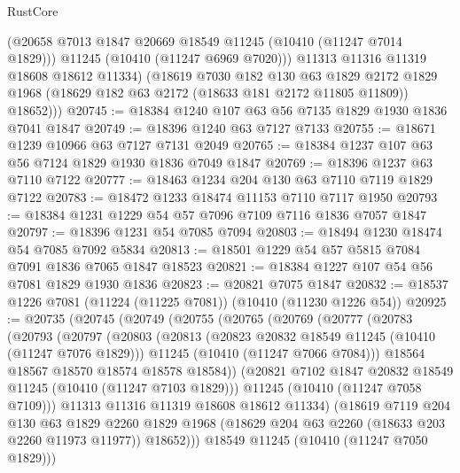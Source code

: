 \begin{lexlean}{RustCore}
\begin{coremodule}
            (@20658 @7013 @1847 @20669 @18549 @11245 (@10410 (@11247 @7014 @1829)))
            @11245
            (@10410 (@11247 @6969 @7020)))
          @11313
          @11316
          @11319
          @18608
          @18612
          @11334)
        (@18619
          @7030
          @182
          @130
          @63
          @1829
          @2172
          @1829
          @1968
          (@18629 @182 @63 @2172 (@18633 @181 @2172 @11805 @11809))
          @18652)))
@20745 := @18384 @1240 @107 @63 @56 @7135 @1829 @1930 @1836 @7041 @1847
@20749 := @18396 @1240 @63 @7127 @7133
@20755 := @18671 @1239 @10966 @63 @7127 @7131 @2049
@20765 := @18384 @1237 @107 @63 @56 @7124 @1829 @1930 @1836 @7049 @1847
@20769 := @18396 @1237 @63 @7110 @7122
@20777 := @18463 @1234 @204 @130 @63 @7110 @7119 @1829 @7122
@20783 := @18472 @1233 @18474 @11153 @7110 @7117 @1950
@20793 := @18384 @1231 @1229 @54 @57 @7096 @7109 @7116 @1836 @7057 @1847
@20797 := @18396 @1231 @54 @7085 @7094
@20803 := @18494 @1230 @18474 @54 @7085 @7092 @5834
@20813 := @18501 @1229 @54 @57 @5815 @7084 @7091 @1836 @7065 @1847 @18523
@20821 := @18384 @1227 @107 @54 @56 @7081 @1829 @1930 @1836
@20823 := @20821 @7075 @1847
@20832 := @18537 @1226 @7081 (@11224 (@11225 @7081)) (@10410 (@11230 @1226 @54))
@20925 := @20735
    (@20745
      (@20749
        (@20755
          (@20765
            (@20769
              (@20777
                (@20783
                  (@20793
                    (@20797
                      (@20803
                        (@20813
                          (@20823 @20832 @18549 @11245 (@10410 (@11247 @7076 @1829)))
                          @11245
                          (@10410 (@11247 @7066 @7084)))
                        @18564
                        @18567
                        @18570
                        @18574
                        @18578
                        @18584))
                    (@20821 @7102 @1847 @20832 @18549 @11245 (@10410 (@11247 @7103 @1829)))
                    @11245
                    (@10410 (@11247 @7058 @7109)))
                  @11313
                  @11316
                  @11319
                  @18608
                  @18612
                  @11334)
                (@18619
                  @7119
                  @204
                  @130
                  @63
                  @1829
                  @2260
                  @1829
                  @1968
                  (@18629 @204 @63 @2260 (@18633 @203 @2260 @11973 @11977))
                  @18652)))
            @18549
            @11245
            (@10410 (@11247 @7050 @1829)))

\end{coremodule}
\end{lexlean}
